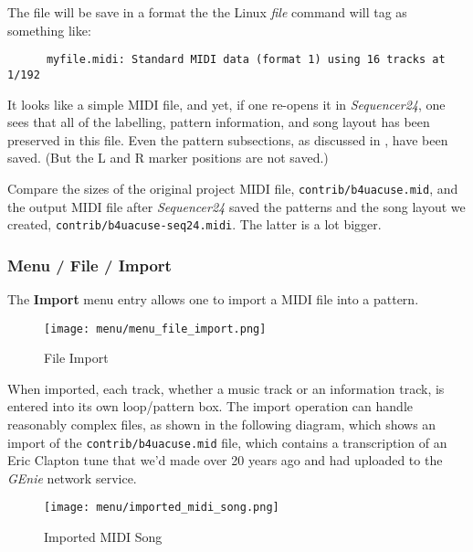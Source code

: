    The file will be save in a format the the Linux \textsl{file} command
   will tag as something like:

   \begin{verbatim}
      myfile.midi: Standard MIDI data (format 1) using 16 tracks at 1/192
   \end{verbatim}

   It looks like a simple MIDI file, and yet, if one re-opens it in
   \textsl{Sequencer24}, one sees that all of the labelling, pattern information,
   and song layout has been preserved in this file.
   Even the pattern subsections, as discussed in
   ,
   have been saved.
   (But the L and R marker positions are not saved.)

   Compare the sizes of the original project MIDI file,
   \texttt{contrib/b4uacuse.mid}, and the output MIDI file after
   \textsl{Sequencer24} saved the patterns and the song layout we created,
   \texttt{contrib/b4uacuse-seq24.midi}.  The latter is a lot
   bigger.  

\subsubsection{Menu / File / Import}
\label{subsubsec:seq24_menu_file_import}

   The \textbf{Import} menu entry allows one to import a MIDI file
   into a pattern.

\begin{figure}[H]
   \centering 
   \texttt{[image: menu/menu\_file\_import.png]}
   \caption{File Import}
   \label{fig:seq24_menu_file_import}
\end{figure}

   When imported, each track, whether a music track or an information track,
   is entered into its own loop/pattern box.  The import operation can
   handle reasonably complex files, as shown in the following diagram, which
   shows an import of the \texttt{contrib/b4uacuse.mid} file, which contains
   a transcription of an Eric Clapton tune that we'd made over 20 
   years ago and had uploaded to the \textsl{GEnie} network service.

\begin{figure}[H]
   \centering 
   \texttt{[image: menu/imported\_midi\_song.png]}
   \caption{Imported MIDI Song}
   \label{fig:seq24_imported_midi_song}
\end{figure}

